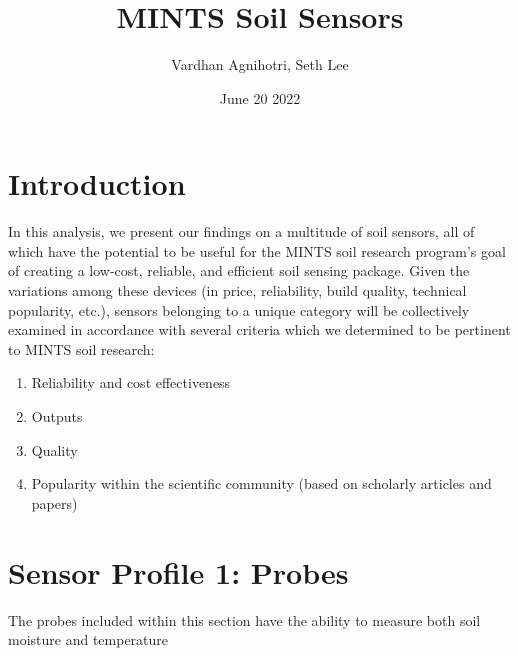 \documentclass{article}
\title{MINTS Soil Sensors}
\author{Vardhan Agnihotri, Seth Lee}
\date{June 20 2022}
\begin{document}
\maketitle

\section{Introduction}
In this analysis, we present our findings on a multitude of soil sensors, all of which have the potential to be useful for the MINTS soil research program's goal of creating a low-cost, reliable, and efficient soil sensing package. Given the variations among these devices (in price, reliability, build quality, technical popularity, etc.), sensors belonging to a unique category will be collectively examined in accordance with several criteria which we determined to be pertinent to MINTS soil research:
\begin{enumerate}
    \item Reliability and cost effectiveness
    \item Outputs
    \item Quality %
    \item Popularity within the scientific community (based on scholarly articles and papers)
\end{enumerate}


\section{Sensor Profile 1: Probes}
The probes included within this section have the ability to measure both soil moisture and temperature
\end{document}
